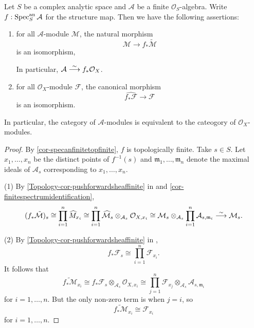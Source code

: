 \begin{proposition}\label{prop-moduletildepush}
    Let $S$ be a complex analytic space and $\mathcal{A}$ be a finite $\mathcal{O}_S$-algebra. Write $f:\operatorname{Spec}^{\mathrm{an}}_S \mathcal{A}$ for the structure map.
    Then we have the following assertions:
    \begin{enumerate}
        \item for all $\mathcal{A}$-module $\mathcal{M}$, the natural morphism 
        \[
            \mathcal{M}\rightarrow f_*\tilde{\mathcal{M}}  
        \]
        is an isomorphism, 
    
        In particular, $\mathcal{A}\stackrel{\sim}{\longrightarrow} f_*\mathcal{O}_X$.
        \item for all $\mathcal{O}_X$-module $\mathcal{F}$, the canonical morphism
            \[
                \widehat{f_*\mathcal{F}}\rightarrow \mathcal{F}
            \]
            is an isomorphism.
    \end{enumerate}
    In particular, the category of $\mathcal{A}$-modules is equivalent to the cateogory of $\mathcal{O}_X$-modules.
\end{proposition}
\begin{proof}
    By \cref{cor-specanfinitetopfinite}, $f$ is topologically finite. 
    Take $s\in S$. 
    Let $x_1,\ldots,x_n$ be the distinct points of $f^{-1}(s)$ and $\mathfrak{m}_1,\ldots,\mathfrak{m}_n$ denote the maximal ideals of $\mathcal{A}_s$ corresponding to $x_1,\ldots,x_n$.

    (1)    
    By \cref{Topology-cor-pushforwardsheaffinite} in  and \cref{cor-finitespectrumidentification},  
    \[
        (f_*\tilde{\mathcal{M}})_s\cong \prod_{i=1}^n \widehat{M}_{x_i}\cong \prod_{i=1}^n \widehat{\mathcal{M}}_s\otimes_{\mathcal{A}_s}\mathcal{O}_{X,x_i}\cong \mathcal{M}_s \otimes_{\mathcal{A}_s}\prod_{i=1}^n \mathcal{A}_{s,\mathfrak{m}_i}\stackrel{\sim}{\longrightarrow} \mathcal{M}_s.
    \]

    (2) By \cref{Topology-cor-pushforwardsheaffinite} in ,
    \[
        f_*\mathcal{F}_s\cong \prod_{i=1}^n \mathcal{F}_{x_i}.  
    \]
    It follows that 
    \[
        \widetilde{f_*\mathcal{M}}_{x_i}\cong f_*\mathcal{F}_s\otimes_{\mathcal{A}_s} \mathcal{O}_{X,x_i}\cong \prod_{j=1}^n \mathcal{F}_{x_j}\otimes_{\mathcal{A}_s} \mathcal{A}_{s,\mathfrak{m}_i}
    \]
    for $i=1,\ldots,n$. But the only non-zero term is when $j=i$, so 
    \[
        \widetilde{f_*\mathcal{M}}_{x_i}\cong \mathcal{F}_{x_i}  
    \]
    for $i=1,\ldots,n$.
\end{proof}
